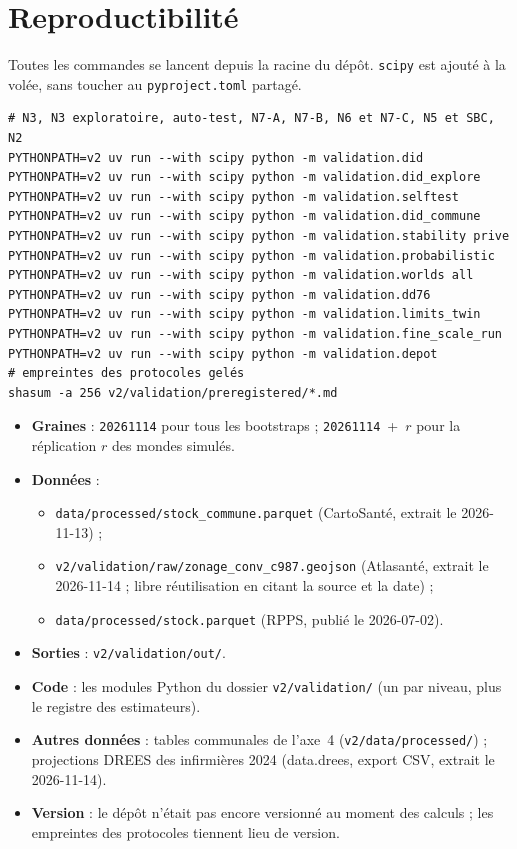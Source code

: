 \section{Reproductibilité}\label{a3-sec:repro}
Toutes les commandes se lancent depuis la racine du dépôt. \texttt{scipy} est ajouté à la volée,
sans toucher au \texttt{pyproject.toml} partagé.
\begin{verbatim}
# N3, N3 exploratoire, auto-test, N7-A, N7-B, N6 et N7-C, N5 et SBC, N2
PYTHONPATH=v2 uv run --with scipy python -m validation.did
PYTHONPATH=v2 uv run --with scipy python -m validation.did_explore
PYTHONPATH=v2 uv run --with scipy python -m validation.selftest
PYTHONPATH=v2 uv run --with scipy python -m validation.did_commune
PYTHONPATH=v2 uv run --with scipy python -m validation.stability prive
PYTHONPATH=v2 uv run --with scipy python -m validation.probabilistic
PYTHONPATH=v2 uv run --with scipy python -m validation.worlds all
PYTHONPATH=v2 uv run --with scipy python -m validation.dd76
PYTHONPATH=v2 uv run --with scipy python -m validation.limits_twin
PYTHONPATH=v2 uv run --with scipy python -m validation.fine_scale_run
PYTHONPATH=v2 uv run --with scipy python -m validation.depot
# empreintes des protocoles gelés
shasum -a 256 v2/validation/preregistered/*.md
\end{verbatim}
\begin{itemize}
  \item \textbf{Graines} : \texttt{20261114} pour tous les bootstraps ; \texttt{20261114}~+~$r$ pour
        la réplication $r$ des mondes simulés.
  \item \textbf{Données} :
        \begin{itemize}
          \item \texttt{data/processed/stock\_commune.parquet} (CartoSanté, extrait le 2026-11-13) ;
          \item \texttt{v2/validation/raw/zonage\_conv\_c987.geojson} (Atlasanté, extrait le
                2026-11-14 ; libre réutilisation en citant la source et la date) ;
          \item \texttt{data/processed/stock.parquet} (RPPS, publié le 2026-07-02).
        \end{itemize}
  \item \textbf{Sorties} : \texttt{v2/validation/out/}.
  \item \textbf{Code} : les modules Python du dossier \texttt{v2/validation/} (un par niveau,
        plus le registre des estimateurs).
  \item \textbf{Autres données} : tables communales de l'axe~4
        (\texttt{v2/data/processed/}) ; projections DREES des infirmières 2024 (data.drees, export
        CSV, extrait le 2026-11-14).
  \item \textbf{Version} : le dépôt n'était pas encore versionné au moment des calculs ; les
        empreintes des protocoles tiennent lieu de version.
\end{itemize}

